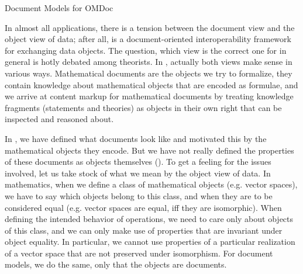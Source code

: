 
\begin{module}[id=document-model]
\begin{omgroup}[id=document-model]{Document Models for OMDoc}

In almost all {\xml} applications, there is a tension between the document view and the
object view of data; after all, {\xml} is a document-oriented interoperability framework
for exchanging data objects. The question, which view is the correct one for {\xml} in
general is hotly debated among {\xml} theorists. In {\omdoc}, actually both views make
sense in various ways. Mathematical documents are the objects we try to formalize, they
contain knowledge about mathematical objects that are encoded as formulae, and we arrive
at content markup for mathematical documents by treating knowledge fragments (statements
and theories) as objects in their own right that can be inspected and reasoned about.

\begin{omtext}
  In {}, we have defined what {\omdoc} documents look like and motivated
  this by the mathematical objects they encode. But we have not really defined the
  properties of these documents as objects themselves (). To get a feeling
  for the issues involved, let us take stock of what we mean by the object view of
  data. In mathematics, when we define a class of mathematical objects (e.g.  vector
  spaces), we have to say which objects belong to this class, and when they are to be
  considered equal (e.g.  vector spaces are equal, iff they are isomorphic). When defining
  the intended behavior of operations, we need to care only about objects of this class,
  and we can only make use of properties that are invariant under object equality. In
  particular, we cannot use properties of a particular realization of a vector space that
  are not preserved under isomorphism. For document models, we do the same, only that the
  objects are documents.
\end{omtext}


\end{omgroup}
\end{module}
